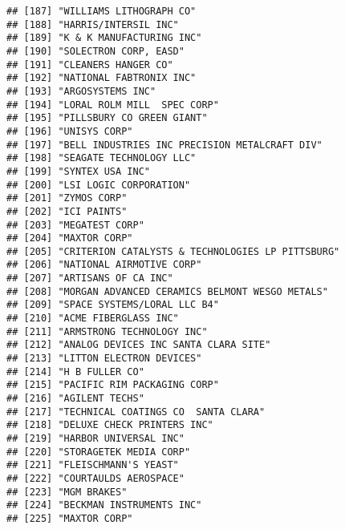 \documentclass[
]{book}
\begin{document}
\begin{verbatim}
## [187] "WILLIAMS LITHOGRAPH CO"                                  
## [188] "HARRIS/INTERSIL INC"                                     
## [189] "K & K MANUFACTURING INC"                                 
## [190] "SOLECTRON CORP, EASD"                                    
## [191] "CLEANERS HANGER CO"                                      
## [192] "NATIONAL FABTRONIX INC"                                  
## [193] "ARGOSYSTEMS INC"                                         
## [194] "LORAL ROLM MILL  SPEC CORP"                              
## [195] "PILLSBURY CO GREEN GIANT"                                
## [196] "UNISYS CORP"                                             
## [197] "BELL INDUSTRIES INC PRECISION METALCRAFT DIV"            
## [198] "SEAGATE TECHNOLOGY LLC"                                  
## [199] "SYNTEX USA INC"                                          
## [200] "LSI LOGIC CORPORATION"                                   
## [201] "ZYMOS CORP"                                              
## [202] "ICI PAINTS"                                              
## [203] "MEGATEST CORP"                                           
## [204] "MAXTOR CORP"                                             
## [205] "CRITERION CATALYSTS & TECHNOLOGIES LP PITTSBURG"         
## [206] "NATIONAL AIRMOTIVE CORP"                                 
## [207] "ARTISANS OF CA INC"                                      
## [208] "MORGAN ADVANCED CERAMICS BELMONT WESGO METALS"           
## [209] "SPACE SYSTEMS/LORAL LLC B4"                              
## [210] "ACME FIBERGLASS INC"                                     
## [211] "ARMSTRONG TECHNOLOGY INC"                                
## [212] "ANALOG DEVICES INC SANTA CLARA SITE"                     
## [213] "LITTON ELECTRON DEVICES"                                 
## [214] "H B FULLER CO"                                           
## [215] "PACIFIC RIM PACKAGING CORP"                              
## [216] "AGILENT TECHS"                                           
## [217] "TECHNICAL COATINGS CO  SANTA CLARA"                      
## [218] "DELUXE CHECK PRINTERS INC"                               
## [219] "HARBOR UNIVERSAL INC"                                    
## [220] "STORAGETEK MEDIA CORP"                                   
## [221] "FLEISCHMANN'S YEAST"                                     
## [222] "COURTAULDS AEROSPACE"                                    
## [223] "MGM BRAKES"                                              
## [224] "BECKMAN INSTRUMENTS INC"                                 
## [225] "MAXTOR CORP"                                             

\end{verbatim}
\end{document}
